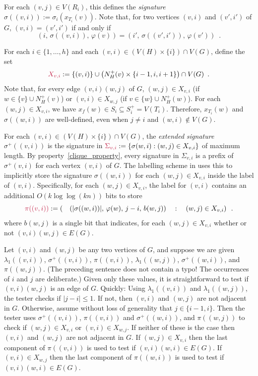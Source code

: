 \documentclass{patmorin}
\makeatletter
\renewcommand{\le}{\leqslant}
\newcommand{\defin}[1]{\emph{\textcolor{brightmaroon}{#1}}}
\def\mathcolor#1#{\@mathcolor{#1}}
\def\@mathcolor#1#2#3{%
  \protect\leavevmode
  \begingroup
    \color#1{#2}#3%
  \endgroup
}
\newcommand{\mathdefin}[1]{\mathcolor{brightmaroon}{#1}}
\makeatother
\begin{document}
  For each $(v,j)\in V(R_i)$, this defines the \defin{signature} $\sigma((v,i)):=\sigma_i(x_{T_i}(v))$.  Note that, for two vertices $(v,i)$ and $(v',i')$ of $G$, $(v,i)=(v',i')$ if and only if
  \[
     (i,\,\sigma((v,i)),\,\varphi(v)) = (i',\,\sigma((v',i')),\,\varphi(v')) \enspace .
  \]


  For each $i\in\{1,\ldots,h\}$ and each $(v,i)\in (V(H)\times\{i\})\cap V(G)$, define the set
  \[
     \mathdefin{X_{v,i}}:= \{(v,i)\}\cup \left(N_H^+(v)\times\{i-1,i,i+1\}\right)\cap V(G) \enspace .
  \]
  Note that, for every edge $(v,i)(w,j)$ of $G$, $(w,j)\in X_{v,i}$ (if $w\in \{v\}\cup N^+_H(v)$) or $(v,i)\in X_{w,j}$ (if $v\in \{w\}\cup N^+_H(w)$).
  For each $(w,j)\in X_{v,i}$, we have $x_f(w)\in S_i\subseteq S^+_i=V(T_i)$. Therefore, $x_{T_i}(w)$ and $\sigma((w,i))$ are well-defined, even when $j\neq i$ and $(w,i)\not\in V(G)$.

  For each $(v,i)\in (V(H)\times\{i\})\cap V(G)$, the \defin{extended signature} \defin{$\sigma^+((v,i))$} is the signature in $\mathdefin{\Sigma_{v,i}}:=\{\sigma(w,i):(w,j)\in X_{v,i}\}$ of maximum length.  By property~\ref{clique_property}, every signature in $\Sigma_{v,i}$ is a prefix of $\sigma^+(v,i)$ for each vertex $(v,i)$ of $G$. The labelling scheme in \cite{dujmovic.esperet.ea:adjacency} uses this to implicitly store the signature $\sigma((w,i))$ for each $(w,j)\in X_{v,i}$ inside the label of $(v,i)$. Specifically, for each $(w,j)\in X_{v,i}$, the label for $(v,i)$ contains an additional $O(k\log\log (kn))$ bits to store
  \begin{equation}
     \mathdefin{\pi((v,i))}:= \left( \quad(|\sigma((w,i))|,\, \varphi(w),\, j-i,\, b(w,j))\quad :\quad (w,j)\in X_{v,i}\right) \enspace . \label{four_tuple}
  \end{equation}
  where $b(w,j)$ is a single bit that indicates, for each $(w,j)\in X_{v,i}$ whether or not $(v,i)(w,j)\in E(G)$.

  Let $(v,i)$ and $(w,j)$ be any two vertices of $G$, and suppose we are given $\lambda_1((v,i))$, $\sigma^+((v,i))$, $\pi((v,i))$, $\lambda_1((w,j))$, $\sigma^+((w,i))$, and $\pi((w,j))$.  (The preceding sentence does not contain a typo! The occurrences of $i$ and $j$ are deliberate.) Given only these values, it is straightforward to test if $(v,i)
  (w,j)$ is an edge of $G$.  Quickly: Using $\lambda_1((v,i))$ and $\lambda_1((w,j))$, the tester checks if $|j-i|\le 1$.  If not, then $(v,i)$ and $(w,j)$ are not adjacent in $G$.  Otherwise, assume without loss of generality that $j\in\{i-1, i\}$. Then the tester uses $\sigma^+((v,i))$, $\pi((v,i))$ and $\sigma^+((w,i))$, and $\pi((w,j))$ to check if $(w,j)\in X_{v,i}$ or $(v,i)\in X_{w,j}$.
  If neither of these is the case then $(v,i)$ and $(w,j)$ are not adjacent in $G$.  If $(w,j)\in X_{v,i}$ then the last component of $\pi((v,i))$ is used to test if $(v,i)(w,i)\in E(G)$.  If $(v,i)\in X_{w,j}$ then the last component of $\pi((w,i))$ is used to test if $(v,i)(w,i)\in E(G)$.
\end{document}
